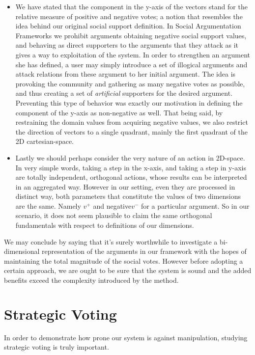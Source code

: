 \documentclass{article}
\begin{document}
{\begin{itemize}
\item We have stated that the component in the y-axis of the vectors stand for the relative measure of positive and negative votes; a notion that resembles the idea behind our original social support definition. In Social Argumentation Frameworks we prohibit arguments obtaining negative social support values, and behaving as direct supporters to the arguments that they attack as it gives a way to exploitation of the system. In order to strengthen an argument she has defined, a user may simply introduce a set of illogical arguments and attack relations from these argument to her initial argument. The idea is provoking the community and gathering as many negative votes as possible, and thus creating a set of \textit{artificial} supporters for the desired argument. Preventing this type of behavior was exactly our motivation in defining the component of the y-axis as non-negative as well. That being said, by restraining the domain values from acquiring negative values, we also restrict the direction of vectors to a single quadrant, mainly the first quadrant of the 2D cartesian-space.

\item Lastly we should perhaps consider the very nature of an action in 2D-space. In very simple words, taking a step in the x-axis, and taking a step in y-axis are totally independent, orthogonal actions, whose results can be interpreted in an aggregated way. However in our setting, even they are processed in distinct way, both parameters that constitute the values of two dimensions are the same. Namely $v^{+}$ and negative$v^{-}$ for a particular argument. So in our scenario, it does not seem plausible to claim the same orthogonal fundamentals with respect to definitions of our dimensions. 

\end{itemize}

We may conclude by saying that it's surely worthwhile to investigate a bi-dimensional representation of the arguments in our framework with the hopes of maintaining the total magnitude of the social votes. However before adopting a certain approach, we are ought to be sure that the system is sound and the added benefits exceed the complexity introduced by the method.
}
 
\section{Strategic Voting}
In order to demonstrate how prone our system is against manipulation, studying strategic voting is truly important.
\end{document}

